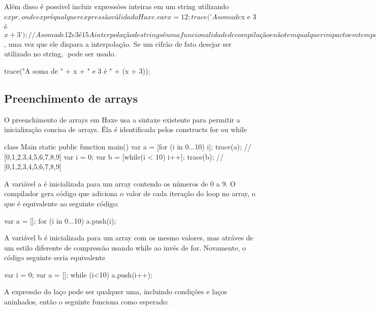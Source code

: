 {Além disso é possível incluir expressões inteiras em um string utilizando ${expr}, onde expr é qualquer expressão válida do Haxe.

var x = 12;
trace(’A soma de $x e 3 é ${x + 3}’);
// A soma de 12 e 3 é 15

A interpolação de strings é uma funcionalidade de compilação e não tem qualquer impacto em tempo de execução. O exemplo acima é equivalente a concatenação manual, que é exatamente o que o compilador gera:


Claro que o uso de strings com aspas simples sem qualquer interpolação permanece válido, mas cudiado deve ser tomado em relação ao caractere $, uma vez que ele dispara a interpolação. Se um cifrão de fato desejar ser utilizado no string, $$ pode ser usado.

trace("A soma de " + x + " e 3 é " + (x + 3));


\subsection{Preenchimento de arrays}

O preenchimento de arrays em Haxe usa a sintaxe existente para permitir a inicialização concisa de arrays. Éla é identificada pelos constructs for ou while

class Main {
    static public function main() {
        var a = [for (i in 0...10) i];
        trace(a); // [0,1,2,3,4,5,6,7,8,9]
        var i = 0;
        var b = [while(i < 10) i++];
        trace(b); // [0,1,2,3,4,5,6,7,8,9]
    }
}

A variável a é inicializada para um array contendo os números de 0 a 9. O compilador gera código que adiciona o valor de cada iteração do loop no array, o que é equivalente ao seguinte código:

var a = [];
for (i in 0...10) a.push(i);

A variável b é inicializada para um array com os mesmo valores, mas atráves de um estilo diferente de compressão usando while ao invés de for. Novamente, o código seguinte seria equivalente

var i = 0;
var a = [];
while (i<10) a.push(i++);

A expressão do laço pode ser qualquer uma, incluindo condições e laços aninhados, então o seguinte funciona como esperado:

}

